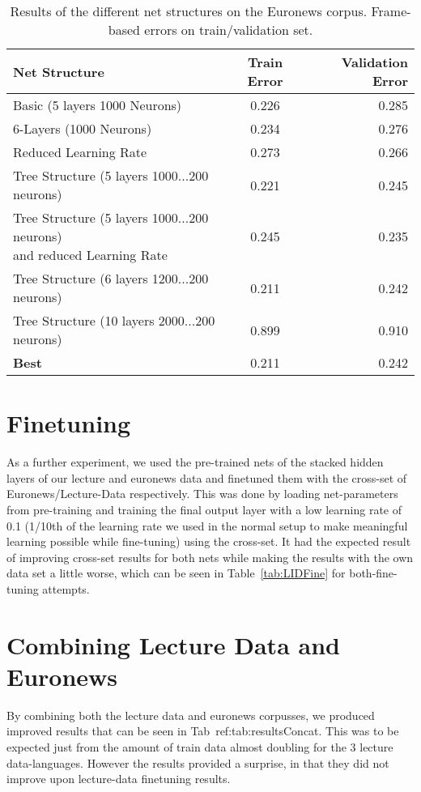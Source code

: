 \begin{table}[h!]
\label{tab:resFrameBased}
\centering
\begin{tabular}{| l | c | r | }
	\hline
	\textbf{Net Structure} & \textbf{Train Error} & \textbf{Validation Error}  \\
	\hline
	Basic (5 layers 1000 Neurons) & 0.226 &  0.285 \\
	\hline
	6-Layers (1000 Neurons) & 0.234 & 0.276 \\
	\hline
	Reduced Learning Rate & 0.273 & 0.266 \\ 
	\hline
	Tree Structure (5 layers 1000...200 neurons) & 0.221 & 0.245 \\
	\hline
	\parbox[t]{5cm}{Tree Structure (5 layers 1000...200 neurons)\\and reduced Learning Rate} & 0.245 & 0.235 \\
	\hline
	Tree Structure (6 layers 1200...200 neurons) & 0.211 & 0.242 \\
	\hline
	Tree Structure (10 layers 2000...200 neurons) & 0.899 & 0.910 \\
	\hline
	\textbf{Best} & 0.211 & 0.242 \\
	\hline
\end{tabular}
\caption{Results of the different net structures on the Euronews corpus. Frame-based errors on train/validation set.}
\end{table}


\section{Finetuning}
\label{sec:LIDNetwork:Fine}
As a further experiment, we used the pre-trained nets of the stacked hidden layers of our lecture and euronews data and finetuned them with the cross-set of Euronews/Lecture-Data respectively. This was done by loading net-parameters from pre-training and training the final output layer with a low learning rate of 0.1 (1/10th of the learning rate we used in the normal setup to make meaningful learning possible while fine-tuning) using the cross-set. It had the expected result of improving cross-set results for both nets while making the results with the own data set a little worse, which can be seen in Table~\ref{tab:LIDFine} for both-fine-tuning attempts.

\section{Combining Lecture Data and Euronews}
\label{sec:LIDNetworkConcat}
By combining both the lecture data and euronews corpusses, we produced improved results that can be seen in Tab~{ref:tab:resultsConcat}. This was to be expected just from the amount of train data almost doubling for the 3 lecture data-languages. However the results provided a surprise, in that they did not improve upon lecture-data finetuning results. 

